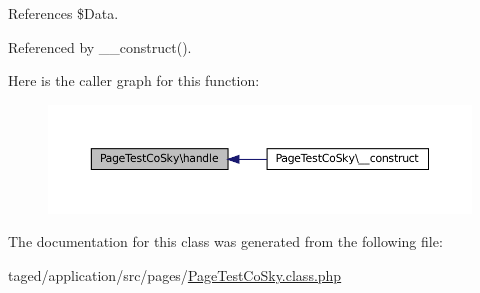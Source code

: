 References \$\+Data.



Referenced by \+\_\+\+\_\+construct().

Here is the caller graph for this function\+:\nopagebreak
\begin{figure}[H]
\begin{center}
\leavevmode
\includegraphics[width=350pt]{class_page_test_co_sky_a5fc9b3bf4014917cca71917a46f82bfc_icgraph}
\end{center}
\end{figure}


The documentation for this class was generated from the following file\+:\begin{DoxyCompactItemize}
\item 
taged/application/src/pages/\hyperlink{_page_test_co_sky_8class_8php}{Page\+Test\+Co\+Sky.\+class.\+php}\end{DoxyCompactItemize}
